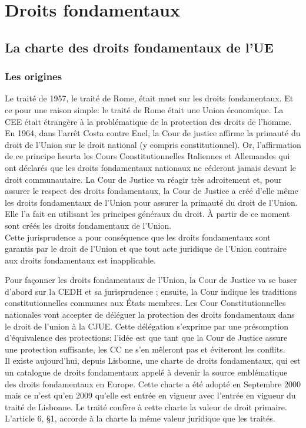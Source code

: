 \documentclass[12pt, a4paper, openany]{book}
\begin{document}
\section{Droits fondamentaux}

\subsection{La charte des droits fondamentaux de l'UE}

\subsubsection{Les origines}

Le traité de 1957, le traité de Rome, était muet sur les droits fondamentaux. Et ce pour une raison simple: le traité de Rome était une Union économique. La CEE était étrangère à la problématique de la protection des droits de l'homme. \\
En 1964, dans l'arrêt Costa contre Enel, la Cour de justice affirme la primauté du droit de l'Union sur le droit national (y compris constitutionnel). Or, l'affirmation de ce principe heurta les Cours Constitutionnelles Italiennes et Allemandes qui ont déclarés que les droits fondamentaux nationaux ne céderont jamais devant le droit communautaire. La Cour de Justice va réagir très adroitement et, pour assurer le respect des droits fondamentaux, la Cour de Justice a créé d'elle même les droits fondamentaux de l'Union pour assurer la primauté du droit de l'Union. Elle l'a fait en utilisant les principes généraux du droit. À partir de ce moment sont créés les droits fondamentaux de l'Union. \\
Cette jurisprudence a pour conséquence que les droits fondamentaux sont garantis par le droit de l'Union et que tout acte juridique de l'Union contraire aux droits fondamentaux est inapplicable.


Pour façonner les droits fondamentaux de l'Union, la Cour de Justice va se baser d'abord sur la CEDH et sa jurisprudence ; ensuite, la Cour indique les traditions constitutionnelles communes aux États membres. Les Cour Constitutionnelles nationales vont accepter de déléguer la protection des droits fondamentaux dans le droit de l'union à la CJUE. Cette délégation s'exprime par une présomption d'équivalence des protections: l'idée est que tant que la Cour de Justice assure une protection suffisante, les CC ne s'en mêleront pas et éviteront les conflits. \\
Il existe aujourd'hui, depuis Lisbonne, une charte de droits fondamentaux, qui est un catalogue de droits fondamentaux appelé à devenir la source emblématique des droits fondamentaux en Europe. Cette charte a été adopté en Septembre 2000 mais ce n'est qu'en 2009 qu'elle est entrée en vigueur avec l'entrée en vigueur du traité de Lisbonne. Le traité confère à cette charte la valeur de droit primaire. L'article 6, §1, accorde à la charte la même valeur juridique que les traités. 
\end{document}
